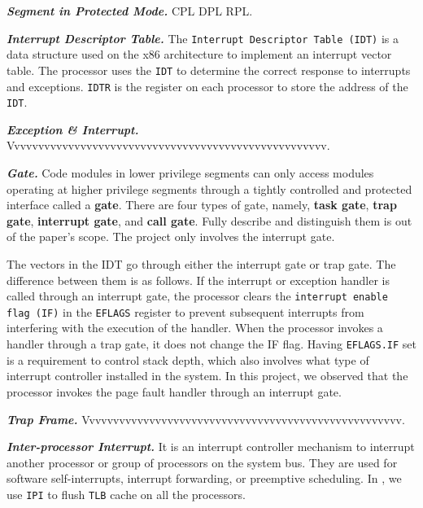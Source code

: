\textbf{\textit{Segment in Protected Mode.}} CPL DPL RPL.


\textbf{\textit{Interrupt Descriptor Table.}} The \texttt{Interrupt Descriptor Table (IDT)} is a data structure used on the x86 architecture to implement an interrupt vector table. The processor uses the \texttt{IDT} to determine the correct response to interrupts and exceptions. \texttt{IDTR} is the register on each processor to store the address of the \texttt{IDT}.

\textbf{\textit{Exception \& Interrupt.}} Vvvvvvvvvvvvvvvvvvvvvvvvvvvvvvvvvvvvvvvvvvvvvvvvvvvvv.

\textbf{\textit{Gate.}} Code modules in lower privilege segments can only access modules operating at higher privilege segments through a tightly controlled and protected interface called a \textbf{gate}.  There are four types of gate, namely, \textbf{task gate}, \textbf{trap gate}, \textbf{interrupt gate}, and \textbf{call gate}. Fully describe and distinguish them is out of the paper's scope. The project only involves the interrupt gate.

The vectors in the IDT go through either the interrupt gate or trap gate. The difference between them is as follows. If the interrupt or exception handler is called through an interrupt gate, the processor clears the \texttt{interrupt enable flag (IF)} in the \texttt{EFLAGS} register to prevent subsequent interrupts from interfering with the execution of the handler.  When the processor invokes a handler through a trap gate, it does not change the IF flag. Having \texttt{EFLAGS.IF} set is a requirement to control stack depth, which also involves what type of interrupt controller installed in the system. In this project, we observed that the processor invokes the page fault handler through an interrupt gate. 




\textbf{\textit{Trap Frame.}} Vvvvvvvvvvvvvvvvvvvvvvvvvvvvvvvvvvvvvvvvvvvvvvvvvvvvv.

\textbf{\textit{Inter-processor Interrupt.}}  It is an interrupt controller mechanism to interrupt another processor or group of processors on the system bus. They are used for software self-interrupts, interrupt forwarding, or preemptive scheduling. In \name, we use \texttt{IPI} to flush \texttt{TLB} cache on all the processors.

